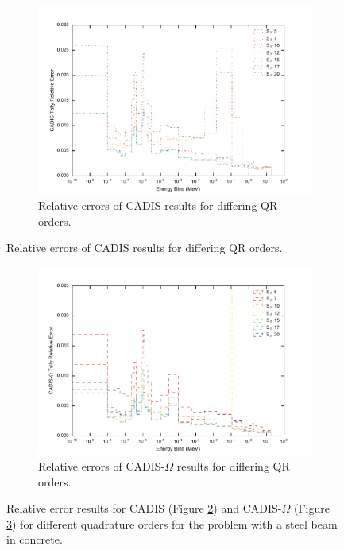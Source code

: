 \begin{figure}[htb!]
  \centering
  \begin{subfigure}[t]{\textwidth}
    \centering
    \includegraphics[width=\linewidth]{./chapters/characterization_probs/figures/angle/prob_1/err_quad_cadis.pdf}
    \caption{Relative errors of CADIS results for differing QR orders.}
    \label{fig:sn_cad_err}
  \end{subfigure}
\end{figure}
\begin{figure}[htb!]\ContinuedFloat
  \centering
  \begin{subfigure}[t]{\textwidth}
    \centering
    \includegraphics[width=\linewidth]{./chapters/characterization_probs/figures/angle/prob_1/err_quad_cadisangle.pdf}
    \caption{Relative errors of CADIS-$\Omega$ results for differing QR
    orders.}
    \label{fig:sn_cadangle_err}
  \end{subfigure}
  \caption[Relative error results for CADIS and CADIS-$\Omega$ for different
  quadrature orders for the problem with a steel beam in concrete.]
  {Relative error results for CADIS (Figure \ref{fig:sn_cad_err})
  and CADIS-$\Omega$ (Figure \ref{fig:sn_cadangle_err}) for different
  quadrature orders for the problem with a steel beam in concrete.}
  \label{fig:sn_errs}
\end{figure}

